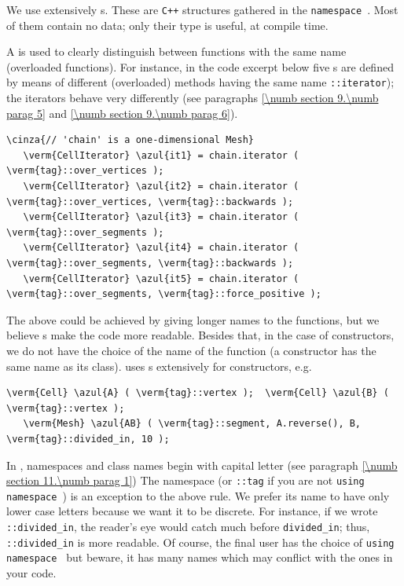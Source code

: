 We use extensively {\small\tt{}}s.
These are {\tt C++} structures gathered in the {\small\tt namespace }.
Most of them contain no data; only their type is useful, at compile time.

A {\small\tt{}} is used to clearly distinguish between functions with the same name
(overloaded functions).
For instance, in the code excerpt below five {\small\tt{}}s are defined
by means of different (overloaded) methods having the same name {\small\tt{}::iterator});
the iterators behave very differently (see paragraphs \ref{\numb section 9.\numb parag 5} and
\ref{\numb section 9.\numb parag 6}).

\begin{Verbatim}[commandchars=\\\{\},formatcom=\small\tt,baselinestretch=0.94]
   \cinza{// 'chain' is a one-dimensional Mesh}
   \verm{CellIterator} \azul{it1} = chain.iterator ( \verm{tag}::over_vertices );
   \verm{CellIterator} \azul{it2} = chain.iterator ( \verm{tag}::over_vertices, \verm{tag}::backwards );
   \verm{CellIterator} \azul{it3} = chain.iterator ( \verm{tag}::over_segments );
   \verm{CellIterator} \azul{it4} = chain.iterator ( \verm{tag}::over_segments, \verm{tag}::backwards );
   \verm{CellIterator} \azul{it5} = chain.iterator ( \verm{tag}::over_segments, \verm{tag}::force_positive );
\end{Verbatim}

The above could be achieved by giving longer names to the functions, but we believe
{\small\tt{}}s make the code more readable.
Besides that, in the case of constructors, we do not have the choice of the name of the function
(a constructor has the same name as its class).
{\ManiFEM} uses {\small\tt{}}s extensively for constructors, e.g.
\begin{Verbatim}[commandchars=\\\{\},formatcom=\small\tt,baselinestretch=0.94]
   \verm{Cell} \azul{A} ( \verm{tag}::vertex );  \verm{Cell} \azul{B} ( \verm{tag}::vertex );
   \verm{Mesh} \azul{AB} ( \verm{tag}::segment, A.reverse(), B, \verm{tag}::divided_in, 10 );
\end{Verbatim}

In \maniFEM, namespaces and class names begin with capital letter
(see paragraph \ref{\numb section 11.\numb parag 1})
The namespace {\small\tt{}} (or {\small\tt {}::tag} if you are not
{\small\tt using namespace }) is an exception to the above rule.
We prefer its name to have only lower case letters because we want it to be
discrete. For instance, if we wrote {\small\tt{}::divided\_in},
the reader's eye would catch {\small\tt{}} much before {\small\tt divided\_in};
thus, {\small\tt{}::divided\_in} is more readable.
Of course, the final user has the choice of {\small\tt using namespace }
but beware, it has many names which may conflict with the ones in your code.

